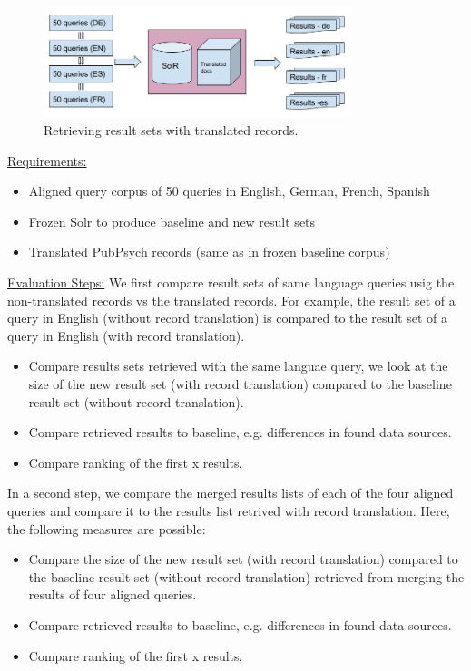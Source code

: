 \documentclass[a4paper,11pt]{article}
\begin{document}
\begin{figure}[h]
	\centering
  \includegraphics[width=0.8\textwidth]{./img/translated_docs.png}
	\caption{Retrieving result sets with translated records.}
	\label{fig4}
\end{figure}

\underline{Requirements:}
\begin{itemize}
\item Aligned query corpus of 50 queries in English, German, French, Spanish
\item Frozen Solr to produce baseline and new result sets
\item Translated PubPsych records (same as in frozen baseline corpus)
\end{itemize}

\underline{Evaluation Steps:}
\newline
We first compare result sets of same language queries usig the non-translated records vs the translated records. For example, the result set of a query in English (without record translation) is compared to the result set of a query in English (with record translation). 
\begin{itemize}
\item Compare results sets retrieved with the same languae query, we look at the size of the new result set (with record translation) compared to the baseline result set (without record translation).
\item Compare retrieved results to baseline, e.g. differences in found data sources.
\item Compare ranking of the first x results.
\end{itemize}

In a second step, we compare the merged results lists of each of the four aligned queries and compare it to the results list retrived with record translation. Here, the following measures are possible:

\begin{itemize}
\item Compare  the size of the new result set (with record translation) compared to the baseline result set (without record translation) retrieved from merging the results of four aligned queries.
\item Compare retrieved results to baseline, e.g. differences in found data sources.
\item Compare ranking of the first x results.
\end{itemize}
\end{document}
